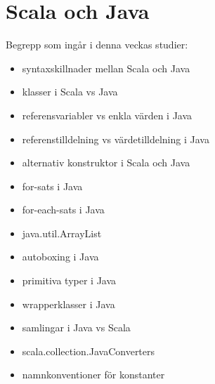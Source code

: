 \chapter{Scala och Java}\label{chapter:W12}
Begrepp som ingår i denna veckas studier:
\begin{itemize}[noitemsep,label={$\square$},leftmargin=*]
\item syntaxskillnader mellan Scala och Java
\item klasser i Scala vs Java
\item referensvariabler vs enkla värden i Java
\item referenstilldelning vs värdetilldelning i Java
\item alternativ konstruktor i Scala och Java
\item for-sats i Java
\item for-each-sats i Java
\item java.util.ArrayList
\item autoboxing i Java
\item primitiva typer i Java
\item wrapperklasser i Java
\item samlingar i Java vs Scala
\item scala.collection.JavaConverters
\item namnkonventioner för konstanter\end{itemize}
